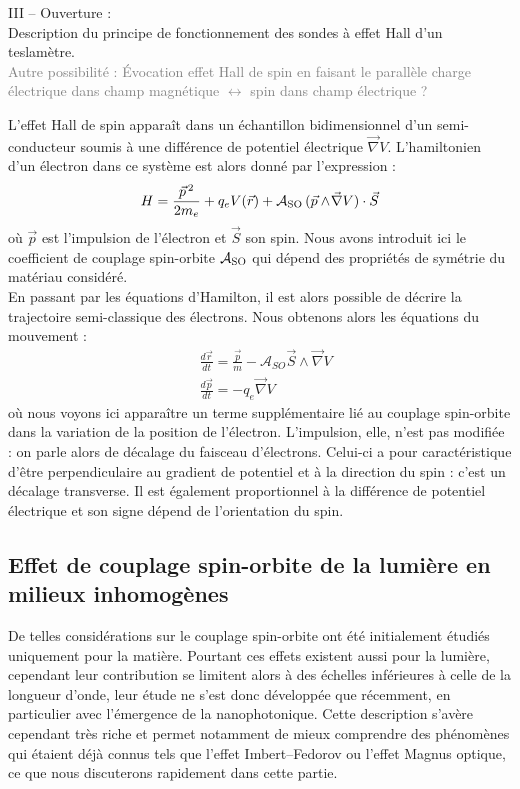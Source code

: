 \documentclass[a4paper,11pt]{article} %
\newenvironment{encart}[1]{%
	\begin{tcolorbox}
		[
		breakable, enhanced jigsaw, %
		arc = 1mm, %
		title = \textbf{#1}, %
		coltitle = white, %
		colbacktitle = blue, %
		colback = white, %
		colframe = blue %
		]
}{		
	\end{tcolorbox}
}
\begin{document}
\begin{encart}{Activité pédagogique 1 : étude de l'effet Hall classique}
		\vspace{0.5cm}
		III -- Ouverture :\\
		Description du principe de fonctionnement des sondes à effet Hall d'un teslamètre.\\
		\textcolor{gray}{Autre possibilité : \'Evocation effet Hall de spin en faisant le parallèle charge électrique dans champ magnétique $ \leftrightarrow $ spin dans champ électrique ?}
	\end{encart}
	
	L'effet Hall de spin apparaît dans un échantillon bidimensionnel d'un semi-conducteur soumis à une différence de potentiel électrique $\vec{\nabla} V$. L'hamiltonien d'un électron dans ce système est alors donné par l'expression :
	\begin{equation*}
		\label{exp_hamiltonien_SHE}
		H = \frac{\vec{p}^{\, 2}}{2m_e} + q_e V(\vec{r}) + \mathcal{A}_\textup{SO} \, (\vec{p} \wedge \! \vec{\nabla} V) \cdot \vec{S}
	\end{equation*}
	où $ \vec{p} $ est l'impulsion de l'électron et $ \vec{S} $ son spin. Nous avons introduit ici le coefficient de couplage spin-orbite $ \mathcal{A}_\textup{SO} $ qui dépend des propriétés de symétrie du matériau considéré.\\
	
	En passant par les équations d'Hamilton, il est alors possible de décrire la trajectoire semi-classique des électrons. Nous obtenons alors les équations du mouvement :
	\begin{align}
		& \frac{d\vec{r}}{dt} = \frac{\vec{p}}{m} - \mathcal{A}_{SO} \vec{S} \wedge \vec{\nabla} V \label{eq_mvt_SHE_r} \\
		& \frac{d \vec{p}}{dt} = - q_e \vec{\nabla} V \label{eq_mvt_SHE_p}
	\end{align}
	où nous voyons ici apparaître un terme supplémentaire lié au couplage spin-orbite dans la variation de la position de l'électron. L'impulsion, elle, n'est pas modifiée : on parle alors de décalage du faisceau d'électrons. Celui-ci a pour caractéristique d'être perpendiculaire au gradient de potentiel et à la direction du spin : c'est un décalage transverse. Il est également proportionnel à la différence de potentiel électrique et son signe dépend de l'orientation du spin.
	
	
	\subsection{Effet de couplage spin-orbite de la lumière en milieux inhomogènes}
	De telles considérations sur le couplage spin-orbite ont été initialement étudiés uniquement pour la matière. Pourtant ces effets existent aussi pour la lumière, cependant leur contribution se limitent alors à des échelles inférieures à celle de la longueur d'onde, leur étude ne s'est donc développée que récemment, en particulier avec l'émergence de la nanophotonique. Cette description s'avère cependant très riche et permet notamment de mieux comprendre des phénomènes qui étaient déjà connus tels que l'effet Imbert--Fedorov ou l'effet Magnus optique, ce que nous discuterons rapidement dans cette partie.\\
	
\end{document}
